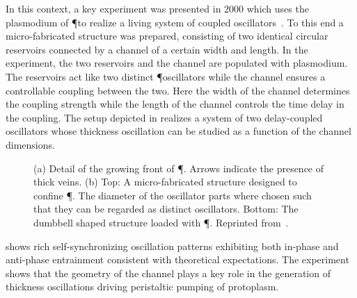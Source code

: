 			In this context, a key experiment was presented in 2000 which uses the plasmodium of \P to realize a living system of coupled oscillators~\cite{PhysRevLett.85.2026}. To this end a micro-fabricated structure was prepared, consisting of two identical circular reservoirs connected by a channel of a certain width and length. In the experiment, the two reservoirs and the channel are populated with plasmodium. The reservoirs act like two distinct \P oscillators while the channel ensures a controllable coupling between the two. Here the width of the channel determines the coupling strength while the length of the channel controls the time delay in the coupling. The setup depicted in  realizes a system of two delay-coupled oscillators whose thickness oscillation can be studied as a function of the channel dimensions.

			\begin{figure}[htb]
				\centering
	
				\caption[Oscillator experiment - Setup]{(a) Detail of the growing front of \P. Arrows indicate the presence of thick veins. (b) Top: A micro-fabricated structure designed to confine \P. The diameter of the oscillator parts where chosen such that they can be regarded as distinct oscillators. Bottom: The dumbbell shaped structure loaded with \P. Reprinted from~\cite{PhysRevLett.85.2026}.}
				\label{fig:oscillator_experiment_setup}
			\end{figure}

			 shows rich self-synchronizing oscillation patterns exhibiting both in-phase and anti-phase entrainment consistent with theoretical expectations. The experiment shows that the geometry of the channel plays a key role in the generation of thickness oscillations driving peristaltic pumping of protoplasm.



